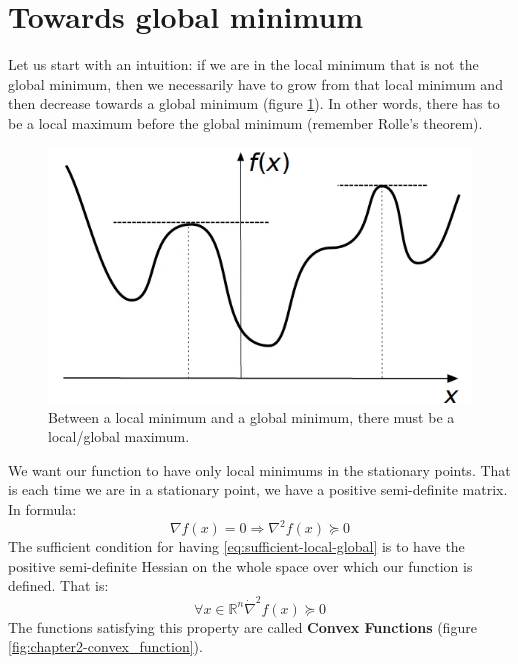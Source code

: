 \section{Towards global minimum}
\par Let us start with an intuition: if we are in the local minimum that is not the global minimum, then we necessarily have to grow from that local minimum and then decrease towards a global minimum (figure \ref{fig:chapter2-towards_global1}). In other words, there has to be a local maximum before the global minimum (remember Rolle's theorem).
\begin{figure}
    \centering
    \includegraphics[scale=0.3]{figures/2/chapter2-towards_global1.png}
    \caption{Between a local minimum and a global minimum, there must be a local/global maximum.}
    \label{fig:chapter2-towards_global1}
\end{figure}
\par We want our function to have only local minimums in the stationary points. That is each time we are in a stationary point, we have a positive semi-definite matrix. In formula:
\begin{equation}
    \label{eq:sufficient-local-global}
    \nabla f(x) = 0 \Rightarrow \nabla^2 f(x) \succeq 0
\end{equation}
The sufficient condition for having \ref{eq:sufficient-local-global} is to have the positive semi-definite Hessian on the whole space over which our function is defined. That is:
\begin{equation}
    \forall x \in \mathbb{R}^n \dot \nabla^2 f(x) \succeq 0
\end{equation}
The functions satisfying this property are called \textbf{Convex Functions} (figure \ref{fig:chapter2-convex_function}).
